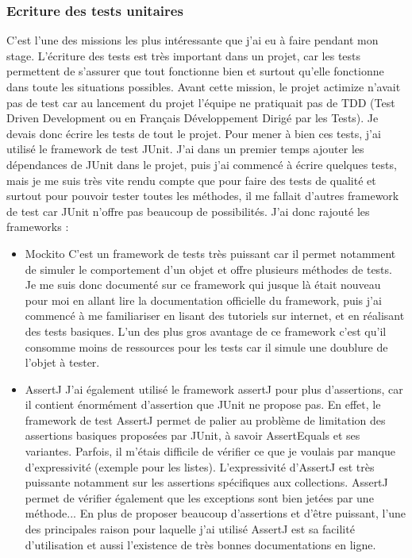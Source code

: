 \documentclass[12pt,a4paper]{report}
\begin{document}
\subsubsection{Ecriture des tests unitaires}
C'est l'une des missions les plus intéressante que j'ai eu à faire pendant mon stage. L'écriture des tests est très important dans un projet, car les tests permettent
de s'assurer que tout fonctionne bien et surtout qu'elle fonctionne dans toute les situations possibles. Avant cette mission, le projet actimize n'avait pas de test car au lancement du 
projet l'équipe ne pratiquait pas de TDD (Test Driven Development ou en Français Développement Dirigé par les Tests). Je devais donc écrire les tests de tout le projet.
\vspace{0.3cm} \newline Pour mener à bien ces tests, j'ai utilisé le framework de test JUnit.\newline
J'ai dans un premier temps ajouter les dépendances de JUnit dans le projet, puis j'ai commencé à écrire quelques tests, mais je me suis très vite rendu compte que pour faire des tests de qualité 
et surtout pour pouvoir tester toutes les méthodes, il me fallait d'autres framework de test car JUnit n'offre pas beaucoup de possibilités.
J'ai donc rajouté les frameworks :
\begin{itemize}
\item Mockito \vspace{0.3cm} \newline
C'est un framework de tests très puissant car il permet notamment de simuler le comportement d'un objet et offre plusieurs méthodes de tests. Je me suis donc documenté sur ce framework qui jusque là était nouveau pour moi en allant lire la documentation officielle du framework, puis j'ai commencé
à me familiariser en lisant des tutoriels sur internet, et en réalisant des tests basiques.
L'un des plus gros avantage de ce framework c'est qu'il consomme moins de ressources pour les tests car il simule une doublure de l'objet à tester.
\item AssertJ \vspace{0.3cm} \newline
J'ai également utilisé le framework assertJ pour plus d'assertions, car il contient énormément d'assertion que JUnit ne propose pas. En effet, le framework de test AssertJ permet de palier au problème de limitation des assertions basiques proposées par JUnit, à savoir AssertEquals et ses variantes. Parfois, il m'étais difficile de vérifier ce que je voulais par manque d'expressivité (exemple pour les listes). L'expressivité d'AssertJ est très puissante notamment sur les assertions spécifiques aux collections. AssertJ permet de vérifier également que les exceptions sont bien jetées par une méthode...\newline
En plus de proposer beaucoup d'assertions et d'être puissant, l'une des principales raison pour laquelle j'ai utilisé AssertJ est sa facilité d'utilisation et aussi l'existence de très bonnes documentations en ligne.
\end{itemize}
\end{document}
